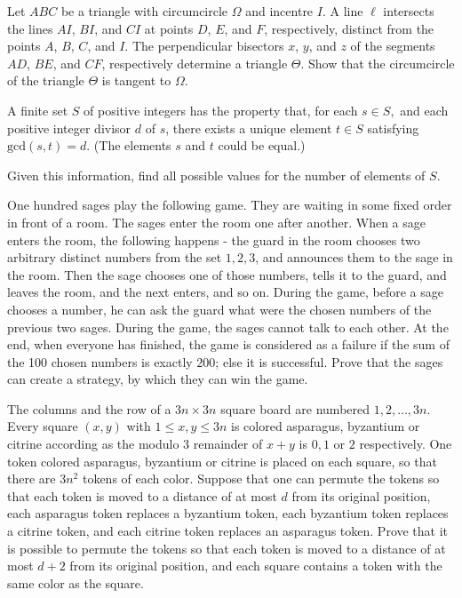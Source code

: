 \documentclass[11pt]{scrartcl}
\begin{document}
\begin{problem}[719467452801051]
Let $ABC$ be a triangle with circumcircle $\Omega$ and incentre $I$. A line $\ell$ intersects the lines $AI$, $BI$, and $CI$ at points $D$, $E$, and $F$, respectively, distinct from the points $A$, $B$, $C$, and $I$. The perpendicular bisectors $x$, $y$, and $z$ of the segments $AD$, $BE$, and $CF$, respectively determine a triangle $\Theta$. Show that the circumcircle of the triangle $\Theta$ is tangent to $\Omega$.
\end{problem}
\begin{problem}[770421031902562]
A finite set $S$ of positive integers has the property that, for each $s \in S,$ and each positive integer divisor $d$ of $s$, there exists a unique element $t \in S$ satisfying $\text{gcd}(s, t) = d$. (The elements $s$ and $t$ could be equal.)

Given this information, find all possible values for the number of elements of $S$.
\end{problem}
\begin{problem}[2212576839999739806]
	One hundred sages play the following game. They are waiting in some fixed order in front of a room. The sages enter the room one after another. When a sage enters the room, the following happens - the guard in the room chooses two arbitrary distinct numbers from the set {$1,2,3$}, and announces them to the sage in the room. Then the sage chooses one of those numbers, tells it to the guard, and leaves the room, and the next enters, and so on. During the game, before a sage chooses a number, he can ask the guard what were the chosen numbers of the previous two sages. During the game, the sages cannot talk to each other. At the end, when everyone has finished, the game is considered as a failure if the sum of the 100 chosen numbers is exactly $200$; else it is successful. Prove that the sages can create a strategy, by which they can win the game.
\end{problem}
\begin{problem}[8617608868051245066]
	The columns and the row of a $3n \times 3n$ square board are numbered $1,2,\ldots ,3n$. Every square $(x,y)$ with $1 \leq x,y \leq 3n$ is colored asparagus, byzantium or citrine according as the modulo $3$ remainder of $x+y$ is $0,1$ or $2$ respectively. One token colored asparagus, byzantium or citrine is placed on each square, so that there are $3n^2$ tokens of each color.
Suppose that one can permute the tokens so that each token is moved to a distance of at most $d$ from its original position, each asparagus token replaces a byzantium token, each byzantium token replaces a citrine token, and each citrine token replaces an asparagus token. Prove that it is possible to permute the tokens so that each token is moved to a distance of at most $d+2$ from its original position, and each square contains a token with the same color as the square.
\end{problem}
\end{document}
